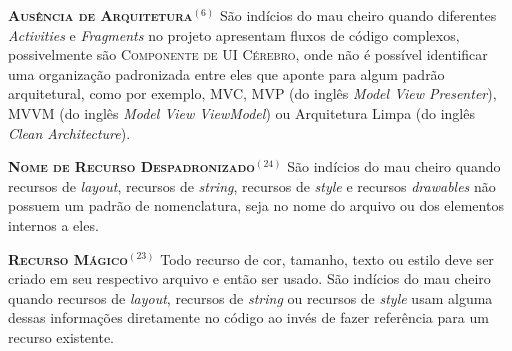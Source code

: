   \noindent
  \textsc{\textbf{{\small Ausência de Arquitetura}}}$^{(6)}$ São indícios do mau cheiro quando diferentes \textit{Activities} e \textit{Fragments} no projeto apresentam fluxos de código complexos, possivelmente são \textsc{\small Componente de UI Cérebro}, onde não é possível identificar uma organização padronizada entre eles que aponte para algum padrão arquitetural, como por exemplo, MVC, MVP (do inglês \textit{Model View Presenter}), MVVM (do inglês \textit{Model View ViewModel}) ou Arquitetura Limpa (do inglês \textit{Clean Architecture}).



  \noindent
  \textbf{\textsc{{\small Nome de Recurso Despadronizado}}}$^{(24)}$
      São indícios do mau cheiro quando recursos de \textit{layout}, recursos de \textit{string}, recursos de \textit{style} e recursos \textit{drawables} não possuem um padrão de nomenclatura, seja no nome do arquivo ou dos elementos internos a eles.



  \noindent
  \textbf{\textsc{{\small Recurso Mágico}}}$^{(23)}$
      Todo recurso de cor, tamanho, texto ou estilo deve ser criado em seu respectivo arquivo e então ser usado. São indícios do mau cheiro quando recursos de \textit{layout}, recursos de \textit{string} ou recursos de \textit{style} usam alguma dessas informações diretamente no código ao invés de fazer referência para um recurso existente.

